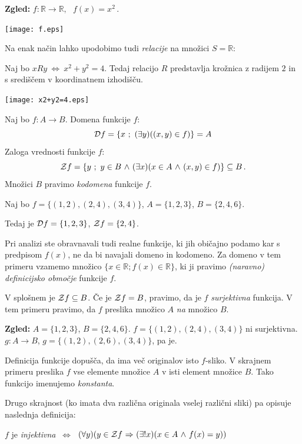 \documentclass[11pt,paper=b5,footinclude,headinclude]{scrbook} %
\newcounter{example}
\def\inn {{~\wedge~}}
\def\sledi {{~\Rightarrow~}}
\def\cee {{~\Leftrightarrow~}}
\begin{document}
\textbf{ Zgled:} $f:\mathbb{R}\to \mathbb{R},~~~f(x) = x^2\,.$
\begin{center}
\texttt{[image: f.eps]}
\end{center}

\medskip

Na enak način lahko upodobimo tudi {\em relacije} na množici  $S =\mathbb{R}$:

Naj bo $xRy \cee x^2+y^2 = 4$.
Tedaj relacijo $R$ predstavlja krožnica z radijem $2$ in s središčem v koordinatnem izhodišču.

\begin{center}
\texttt{[image: x2+y2=4.eps]}
\end{center}

\bigskip
Naj bo $f:A\to B$. Domena funkcije $f$:
$${\cal D}f = \{x~;~(\exists y)((x,y)\in f)\} = A$$
Zaloga vrednosti funkcije $f$:
$${\cal Z}f = \{y~;~y\in B\inn (\exists x)(x\in A\inn (x,y)\in f)\} \subseteq B\,.$$
Množici $B$ pravimo \emph{ kodomena} funkcije $f$.

\medskip
\begin{example*}
Naj bo $f = \{(1,2),(2,4),(3,4)\}$, $A = \{1,2,3\}$, $B = \{2,4,6\}$.

Tedaj je ${\cal D}f = \{1,2,3\}$, ${\cal Z}f = \{2,4\}$.\end{example*}

\bigskip
Pri analizi ste obravnavali tudi realne funkcije, ki jih običajno podamo kar s predpisom $f(x)$, ne da bi navajali domeno in kodomeno.
Za domeno v tem primeru vzamemo množico $\{x\in \mathbb{R}; f(x)\in \mathbb{R}\}$, ki ji
pravimo \emph{ (naravno) definicijsko območje} funkcije $f$.

\bigskip
V splošnem je ${\cal Z}f \subseteq B$. Če je ${\cal Z}f  = B$, pravimo, da je  $f$ {\em surjektivna} funkcija.
V tem primeru pravimo, da $f$ preslika množico $A$ {\em na} množico $B$.

\bigskip
\textbf{ Zgled:} $A = \{1,2,3\}$, $B = \{2,4,6\}$. $f= \{(1,2),(2,4),(3,4)\}$ ni surjektivna. $g:A\to B$, $g = \{(1,2),(2,6),(3,4)\}$, pa je.

\bigskip
Definicija funkcije dopušča, da ima več originalov isto $f$-sliko. V skrajnem primeru preslika $f$ vse elemente množice $A$ v isti element množice $B$. Tako funkcijo imenujemo {\em konstanta}.

Drugo skrajnost (ko imata dva različna originala vselej različni sliki) pa opisuje
naslednja definicija:

$f$ je {\em injektivna} $\cee$ $(\forall y)(y\in {\cal Z}f\sledi (\exists!x)(x\in A \inn f(x) = y))$
\end{document}
